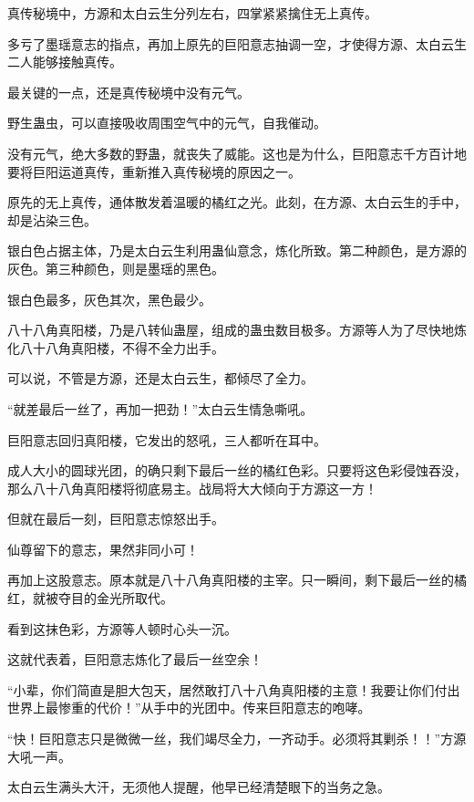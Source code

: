 
\begin{this_body}

真传秘境中，方源和太白云生分列左右，四掌紧紧擒住无上真传。

多亏了墨瑶意志的指点，再加上原先的巨阳意志抽调一空，才使得方源、太白云生二人能够接触真传。

最关键的一点，还是真传秘境中没有元气。

野生蛊虫，可以直接吸收周围空气中的元气，自我催动。

没有元气，绝大多数的野蛊，就丧失了威能。这也是为什么，巨阳意志千方百计地要将巨阳运道真传，重新推入真传秘境的原因之一。

原先的无上真传，通体散发着温暖的橘红之光。此刻，在方源、太白云生的手中，却是沾染三色。

银白色占据主体，乃是太白云生利用蛊仙意念，炼化所致。第二种颜色，是方源的灰色。第三种颜色，则是墨瑶的黑色。

银白色最多，灰色其次，黑色最少。

八十八角真阳楼，乃是八转仙蛊屋，组成的蛊虫数目极多。方源等人为了尽快地炼化八十八角真阳楼，不得不全力出手。

可以说，不管是方源，还是太白云生，都倾尽了全力。

“就差最后一丝了，再加一把劲！”太白云生情急嘶吼。

巨阳意志回归真阳楼，它发出的怒吼，三人都听在耳中。

成人大小的圆球光团，的确只剩下最后一丝的橘红色彩。只要将这色彩侵蚀吞没，那么八十八角真阳楼将彻底易主。战局将大大倾向于方源这一方！

但就在最后一刻，巨阳意志惊怒出手。

仙尊留下的意志，果然非同小可！

再加上这股意志。原本就是八十八角真阳楼的主宰。只一瞬间，剩下最后一丝的橘红，就被夺目的金光所取代。

看到这抹色彩，方源等人顿时心头一沉。

这就代表着，巨阳意志炼化了最后一丝空余！

“小辈，你们简直是胆大包天，居然敢打八十八角真阳楼的主意！我要让你们付出世界上最惨重的代价！”从手中的光团中。传来巨阳意志的咆哮。

“快！巨阳意志只是微微一丝，我们竭尽全力，一齐动手。必须将其剿杀！！”方源大吼一声。

太白云生满头大汗，无须他人提醒，他早已经清楚眼下的当务之急。


\end{this_body}
